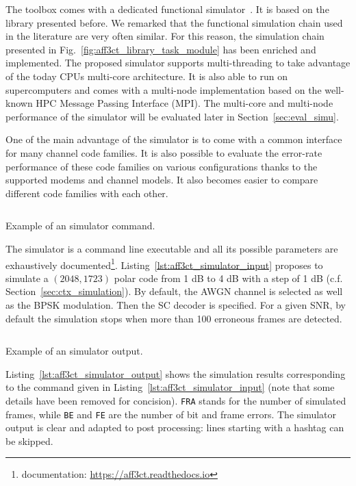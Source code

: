 The \AFFECT toolbox comes with a dedicated functional
simulator~\cite{Cassagne2017}. It is based on the \AFFECT library presented
before. We remarked that the functional simulation chain used in the literature
are very often similar. For this reason, the simulation chain presented in
Fig.~\ref{fig:aff3ct_library_task_module} has been enriched and implemented. The
proposed simulator supports multi-threading to take advantage of the today CPUs
multi-core architecture. It is also able to run on supercomputers and comes with
a multi-node implementation based on the well-known HPC Message Passing
Interface (MPI). The multi-core and multi-node performance of the \AFFECT
simulator will be evaluated later in Section~\ref{sec:eval_simu}.

One of the main advantage of the \AFFECT simulator is to come with a common
interface for many channel code families. It is also possible to evaluate the
error-rate performance of these code families on various configurations thanks
to the supported modems and channel models. It also becomes easier to compare
different code families with each other.

\begin{listing}[htp]
  \inputminted[frame=lines]{bash}{\curChapter/src/use_cases/simulator/input.txt}
  \caption{Example of an \AFFECT simulator command.}
  \label{lst:aff3ct_simulator_input}
\end{listing}

The \AFFECT simulator is a command line executable and all its possible
parameters are exhaustively documented\footnote{\AFFECT documentation:
\url{https://aff3ct.readthedocs.io}}. Listing~\ref{lst:aff3ct_simulator_input}
proposes to simulate a $(2048,1723)$ polar code from 1 dB to 4 dB with a step of
1 dB (c.f. Section~\ref{sec:ctx_simulation}). By default, the AWGN channel is
selected as well as the BPSK modulation. Then the SC decoder is specified. For a
given SNR, by default the simulation stops when more than 100 erroneous frames
are detected.

\begin{listing}[htp]
  \inputminted[frame=lines,linenos]{console}{\curChapter/src/use_cases/simulator/output.txt}
  \caption{Example of an \AFFECT simulator output.}
  \label{lst:aff3ct_simulator_output}
\end{listing}

Listing~\ref{lst:aff3ct_simulator_output} shows the simulation results
corresponding to the \AFFECT command given in
Listing~\ref{lst:aff3ct_simulator_input} (note that some details have been
removed for concision). \verb|FRA| stands for the number of simulated frames,
while \verb|BE| and \verb|FE| are the number of bit and frame errors. The
simulator output is clear and adapted to post processing: lines starting with a
hashtag can be skipped.

